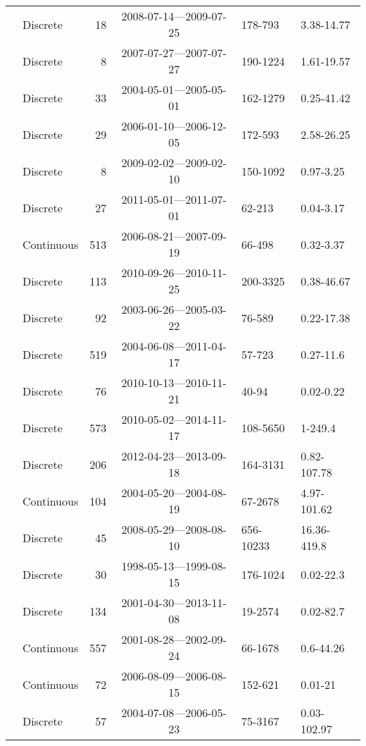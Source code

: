\begin{longtable}{llrcll}
  \citet{Griffin2011} & Discrete &  18 & 2008-07-14---2009-07-25 & 178-793 & 3.38-14.77 \\ 
  \citet{Gueguen2011} & Discrete &   8 & 2007-07-27---2007-07-27 & 190-1224 & 1.61-19.57 \\ 
  \citet{Helms2008} & Discrete &  33 & 2004-05-01---2005-05-01 & 162-1279 & 0.25-41.42 \\ 
  \citet{Hernes2008} & Discrete &  29 & 2006-01-10---2006-12-05 & 172-593 & 2.58-26.25 \\ 
  \citet{Hong2012} & Discrete &   8 & 2009-02-02---2009-02-10 & 150-1092 & 0.97-3.25 \\ 
  \citet{Hur2014} & Discrete &  27 & 2011-05-01---2011-07-01 & 62-213 & 0.04-3.17 \\ 
  \citet{kattegat} & Continuous & 513 & 2006-08-21---2007-09-19 & 66-498 & 0.32-3.37 \\ 
  \citet{Kellerman2015} & Discrete & 113 & 2010-09-26---2010-11-25 & 200-3325 & 0.38-46.67 \\ 
  \citet{Kowalczuk2010} & Discrete &  92 & 2003-06-26---2005-03-22 & 76-589 & 0.22-17.38 \\ 
  \citet{Kowalczuk2010a} & Discrete & 519 & 2004-06-08---2011-04-17 & 57-723 & 0.27-11.6 \\ 
  \citet{Kowalczuk2013} & Discrete &  76 & 2010-10-13---2010-11-21 & 40-94 & 0.02-0.22 \\ 
  \citet{Lambert2015a} & Discrete & 573 & 2010-05-02---2014-11-17 & 108-5650 & 1-249.4 \\ 
  \citet{Loken2016} & Discrete & 206 & 2012-04-23---2013-09-18 & 164-3131 & 0.82-107.78 \\ 
  \citet{lter2004} & Continuous & 104 & 2004-05-20---2004-08-19 & 67-2678 & 4.97-101.62 \\ 
  \citet{lter2008} & Discrete &  45 & 2008-05-29---2008-08-10 & 656-10233 & 16.36-419.8 \\ 
  \citet{lter5653} & Discrete &  30 & 1998-05-13---1999-08-15 & 176-1024 & 0.02-22.3 \\ 
  \citet{lter5689} & Discrete & 134 & 2001-04-30---2013-11-08 & 19-2574 & 0.02-82.7 \\ 
  \citet{Markager2011} & Continuous & 557 & 2001-08-28---2002-09-24 & 66-1678 & 0.6-44.26 \\ 
  \citet{Massicotte2011EA} & Continuous &  72 & 2006-08-09---2006-08-15 & 152-621 & 0.01-21 \\ 
  \citet{Moran2006} & Discrete &  57 & 2004-07-08---2006-05-23 & 75-3167 & 0.03-102.97 \\ 

\end{longtable}
